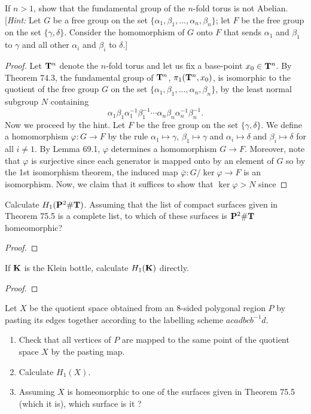 \begin{problem}[Munkres \S74, Ex.\,6]
If $n>1$, show that the fundamental group of the $n$-fold torus is not
Abelian. [\emph{Hint:} Let $G$ be a free group on the set
$\{\alpha_1,\beta_1,...,\alpha_n,\beta_n\}$; let $F$ be the free group on
the set $\{\gamma,\delta\}$. Consider the homomorphism of $G$ onto $F$ that
sends $\alpha_1$ and $\beta_1$ to $\gamma$ and all other $\alpha_i$ and
$\beta_i$ to $\delta$.]
\end{problem}
\begin{proof}
Let $\mathbf{T}^n$ denote the $n$-fold torus and let us fix a base-point
$x_0\in\mathbf{T}^n$. By Theorem 74.3, the fundamental group of $\mathbf{T}^n$,
$\pi_1(\mathbf{T}^n,x_0)$, is isomorphic to the quotient of the free group $G$ on
the set $\{\alpha_1,\beta_1,...,\alpha_n,\beta_n\}$, by the least normal
subgroup $N$ containing
\[
\alpha_1\beta_1\alpha_1^{-1}\beta_1^{-1}
\cdots
\alpha_n\beta_n\alpha_n^{-1}\beta_n^{-1}.
\]
Now we proceed by the hint. Let $F$ be the free group on the set
$\{\gamma,\delta\}$. We define a homomorphism $\varphi\colon G\to F$ by the
rule $\alpha_1\mapsto\gamma$, $\beta_1\mapsto\gamma$ and
$\alpha_i\mapsto\delta$ and $\beta_i\mapsto\delta$ for all $i\neq
1$. By Lemma 69.1, $\varphi$ determines a homomorphism $G\to F$. Moreover,
note that $\varphi$ is surjective since each generator is mapped onto by an
element of $G$ so by the 1st isomorphism theorem, the induced map
$\bar\varphi\colon G/\ker\varphi\to F$ is an isomorphism. Now, we claim
that it suffices to show that $\ker\varphi>N$ since
\end{proof}
\newpage
\begin{problem}[Munkres \S76, Ex.\,1]
Calculate $H_1(\mathbf{P}^2\#\mathbf{T})$. Assuming that the list of compact surfaces given
in Theorem 75.5 is a complete list, to which of these surfaces is $\mathbf{P}^2\#\mathbf{T}$
homeomorphic?
\end{problem}
\begin{proof}
\end{proof}
\newpage
\begin{problem}[Munkres \S76, Ex.\,2]
If $\mathbf{K}$ is the Klein bottle, calculate $H_1(\mathbf{K})$ directly.
\end{problem}
\begin{proof}
\end{proof}
\newpage
\begin{problem}[Munkres \S76, Ex.\,3(a,b,c)]
Let $X$ be the quotient space obtained from an $8$-sided polygonal region
$P$ by pasting its edges together according to the labelling scheme
$acadbcb^{-1}d$.
\begin{enumerate}[label=(\alph*)]
\item Check that all vertices of $P$ are mapped to the same point of the
  quotient space $X$ by the pasting map.
\item Calculate $H_1(X)$.
\item Assuming $X$ is homeomorphic to one of the surfaces given in Theorem
  75.5 (which it is), which surface is it ?
\end{enumerate}
\end{problem}
